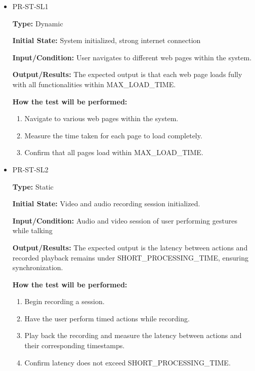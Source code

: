 \documentclass[12pt, titlepage]{article}
\begin{document}
\begin{itemize}
  \item PR-ST-SL1
  \begin{mdframed}[linewidth=0.5mm]
      \textbf{Type:} Dynamic\par
      \textbf{Initial State:} System initialized, strong internet connection \par
      \textbf{Input/Condition:} User navigates to different web pages within the system. \par
      \textbf{Output/Results:} The expected output is that each web page loads fully with all functionalities within MAX\_LOAD\_TIME. \par
      \textbf{How the test will be performed:}
      \begin{enumerate}[noitemsep]
        \item Navigate to various web pages within the system.
        \item Measure the time taken for each page to load completely.
        \item Confirm that all pages load within MAX\_LOAD\_TIME.
      \end{enumerate}
  \end{mdframed}
  \item PR-ST-SL2
  \begin{mdframed}[linewidth=0.5mm]
      \textbf{Type:} Static \par
      \textbf{Initial State:} Video and audio recording session initialized. \par
      \textbf{Input/Condition:} Audio and video session of user performing gestures while talking \par
      \textbf{Output/Results:} The expected output is the latency between actions and recorded playback remains under SHORT\_PROCESSING\_TIME, ensuring synchronization. \par
      \textbf{How the test will be performed:}
      \begin{enumerate}[noitemsep]
        \item Begin recording a session.
        \item Have the user perform timed actions while recording.
        \item Play back the recording and measure the latency between actions and their corresponding timestamps.
        \item Confirm latency does not exceed SHORT\_PROCESSING\_TIME.
      \end{enumerate}
  \end{mdframed}

\end{itemize}
\end{document}
